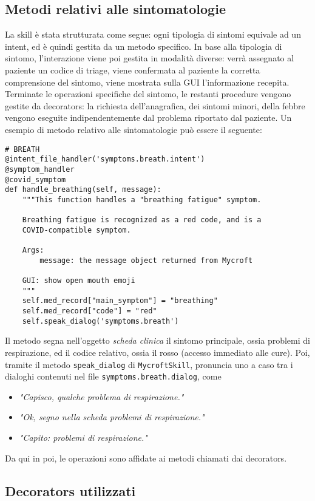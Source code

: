 \subsection{Metodi relativi alle sintomatologie}
La skill è stata strutturata come segue: ogni tipologia di sintomi equivale ad un intent, ed è quindi gestita da un metodo specifico. In base alla tipologia di sintomo, l'interazione viene poi gestita in modalità diverse: verrà assegnato al paziente un codice di triage, viene confermata al paziente la corretta comprensione del sintomo, viene mostrata sulla GUI l'informazione recepita. Terminate le operazioni specifiche del sintomo, le restanti procedure vengono gestite da decorators: la richiesta dell'anagrafica, dei sintomi minori, della febbre vengono eseguite indipendentemente dal problema riportato dal paziente. Un esempio di metodo relativo alle sintomatologie può essere il seguente:
\begin{verbatim}
# BREATH
@intent_file_handler('symptoms.breath.intent')
@symptom_handler
@covid_symptom
def handle_breathing(self, message):
    """This function handles a "breathing fatigue" symptom.

    Breathing fatigue is recognized as a red code, and is a
    COVID-compatible symptom.

    Args:
        message: the message object returned from Mycroft

    GUI: show open mouth emoji
    """
    self.med_record["main_symptom"] = "breathing"
    self.med_record["code"] = "red"
    self.speak_dialog('symptoms.breath')
\end{verbatim}
Il metodo segna nell'oggetto \textit{scheda clinica} il sintomo principale, ossia problemi di respirazione, ed il codice relativo, ossia il rosso (accesso immediato alle cure). Poi, tramite il metodo \texttt{speak\_dialog} di \texttt{MycroftSkill}, pronuncia uno a caso tra i dialoghi contenuti nel file \texttt{symptoms.breath.dialog}, come
\begin{itemize}
    \item \textit{"Capisco, qualche problema di respirazione."}
    \item \textit{"Ok, segno nella scheda problemi di respirazione."}
    \item \textit{"Capito: problemi di respirazione."}
\end{itemize}
Da qui in poi, le operazioni sono affidate ai metodi chiamati dai decorators.
\subsection{Decorators utilizzati}
